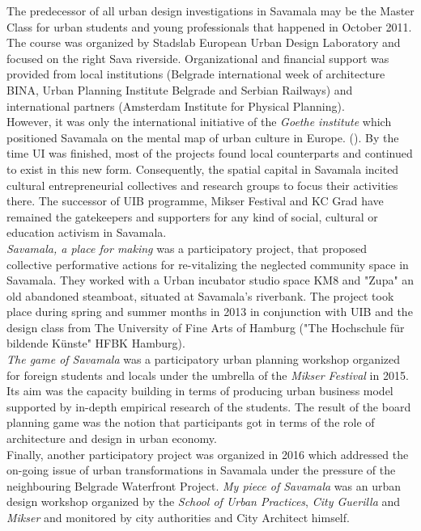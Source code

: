 \documentclass[11pt]{report}
\begin{document}
The predecessor of all urban design investigations in Savamala may be the Master Class for urban students and young professionals that happened in October 2011.
The course was organized by Stadslab European Urban Design Laboratory and focused on the right Sava riverside.
Organizational and financial support was provided from local institutions (Belgrade international week of architecture BINA, Urban Planning Institute Belgrade and Serbian Railways) and international partners (Amsterdam Institute for Physical Planning).
\\
However, it was only the international initiative of the \textit{Goethe institute} which positioned Savamala on the mental map of urban culture in Europe. (\cite{(Kamenzind, Interview director Goethe institute 2013)}).
By the time UI was finished, most of the projects found local counterparts and continued to exist in this new form. Consequently, the spatial capital in Savamala incited cultural entrepreneurial collectives and research groups to focus their activities there.
The successor of UIB programme, Mikser Festival and KC Grad have remained the gatekeepers and supporters for any kind of social, cultural or education activism in Savamala.
\\
\textit{Savamala, a place for making} was a participatory project, that proposed collective performative actions for re-vitalizing the neglected community space in Savamala.
They worked with a Urban incubator studio space KM8 and "Zupa" an old abandoned steamboat, situated at Savamala’s riverbank.
The project took place during spring and summer months in 2013 in conjunction with UIB and the design class from The University of Fine Arts of Hamburg ("The Hochschule für bildende Künste" HFBK Hamburg).
\\
\textit{The game of Savamala} was a participatory urban planning workshop organized for foreign students and locals under the umbrella of the \textit{Mikser Festival} in 2015.
Its aim was the capacity building in terms of producing urban business model supported by in-depth empirical research of the students.
The result of the board planning game was the notion that participants got in terms of the role of architecture and design in urban economy.
\\
Finally, another participatory project was organized in 2016 which addressed the on-going issue of urban transformations in Savamala under the pressure of the neighbouring Belgrade Waterfront Project.
\textit{My piece of Savamala}  was an urban design workshop organized by the \textit{School of Urban Practices}, \textit{City Guerilla} and \textit{Mikser} and monitored by city authorities and City Architect himself.
\end{document}
